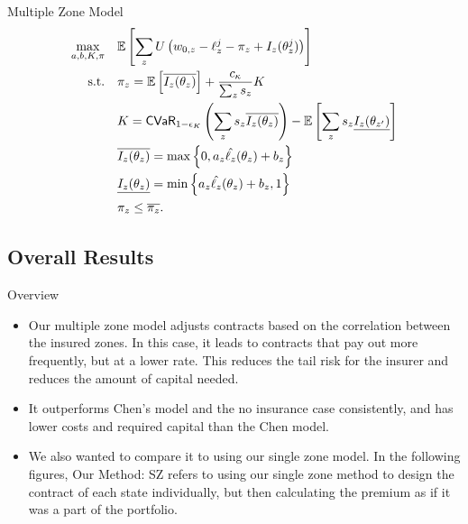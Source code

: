 \documentclass{beamer}
\begin{document}
\begin{frame}{Multiple Zone Model}
    \begin{align}
        \max_{a,b,K,\pi} &\quad \mathbb{E}\left [ \sum_z U\left ( w_{0,z} -\ell_z^j -\pi_z + I_z(\theta^j_z) \right ) \right ]\label{eq-33}\\
        \text{s.t.} &\quad \pi_z  = \mathbb{E}\left [ \overline{I_z(\theta_z)} \right ] + \frac{c_{\kappa}}{\sum_z s_z}  K\\
        &\quad K = {\sf CVaR}_{1-\epsilon_K} \left ( \sum_z s_z\overline{I_z(\theta_z)} \right ) - \mathbb{E}\left [ \sum_{z} s_{z}\underline{I_{z}(\theta_{z'})} \right ] \label{eq-32}\\
        &\quad \overline{I_z(\theta_z)} = \max \left \{0,a_z\hat{\ell_z}(\theta_z) + b_z \right \} \nonumber\\
        &\quad\underline{I_z(\theta_z)} = \min \left \{a_z\hat{\ell_z}(\theta_z)+b_z,1 \right \} \nonumber\\
        &\quad\pi_z \leq \overline{\pi_z} \nonumber.
      \end{align}
\end{frame}

\subsection{Overall Results}
\begin{frame}{Overview}
    \begin{itemize}
        \item Our multiple zone model adjusts contracts based on the correlation between the insured zones. In this case, it leads to contracts that pay out more frequently, but at a lower rate. This reduces the tail risk for the insurer and reduces the amount of capital needed. 
        \item It outperforms Chen's model and the no insurance case consistently, and has lower costs and required capital than the Chen model. 
        \item We also wanted to compare it to using our single zone model. In the following figures, Our Method: SZ refers to using our single zone method to design the contract of each state individually, but then calculating the premium as if it was a part of the portfolio. 
    \end{itemize}
\end{frame}
\end{document}
